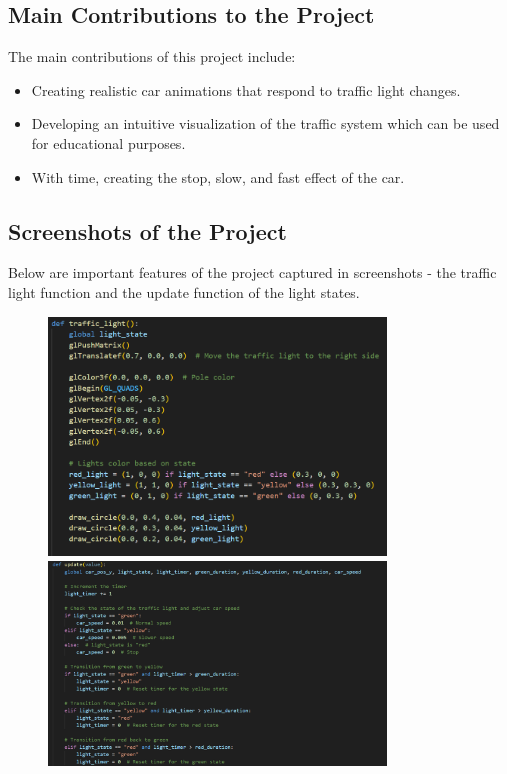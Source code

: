 \documentclass[ fontsize=11pt,twoside]{scrartcl}	%
\begin{document}
\subsection{Main Contributions to the Project}
The main contributions of this project include:
\begin{itemize}
    \item Creating realistic car animations that respond to traffic light changes.
    \item Developing an intuitive visualization of the traffic system which can be used for educational purposes.
    \item With time, creating the stop, slow, and fast effect of the car.
\end{itemize}

\subsection{Screenshots of the Project}
Below are important features of the project captured in screenshots - the traffic light function and the update function of the light states.

\begin{figure}[!htb]
    \centering
    \includegraphics[width=0.8\textwidth]{TrafficLightFunc.png}
    \includegraphics[width=0.8\textwidth]{updatefunc.png}
    \label{fig:traffic_simulation}
\end{figure}
\end{document}
